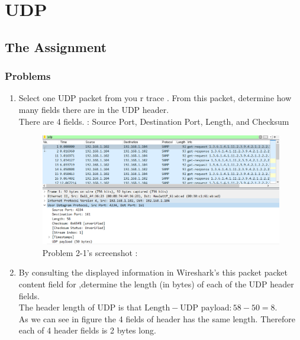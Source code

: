 \section{UDP}
\subsection{The Assignment}
    \subsubsection*{Problems}
    \begin{enumerate}[label=\bfseries Problem \arabic*:,leftmargin=*,labelindent=1em]
        \item Select one UDP packet from you r trace . From this packet, determine how many fields there are in the UDP header.\\[0.2mm]
        \soln There are 4 fields. : Source Port, Destination Port, Length, and Checksum
        \begin{figure}[!h]\centering
        \hspace{15mm}  
    		\includegraphics[width=.85\textwidth]{image/week02/2-1-1.png}
    		\caption{\footnotesize Problem 2-1's screenshot : }
    		\vspace{-10pt}
        \end{figure}
        \item By consulting the displayed information in Wireshark’s this packet packet content field for ,determine the length (in bytes) of each of the UDP header fields.\\[0.2mm]
        \soln The header length of UDP is that $\text{Length} - \text{UDP payload} : 58 - 50 = 8$.\\
        As we can see in figure the 4 fields of header has the same length. Therefore each of 4 header fields is 2 bytes long.

\end{enumerate}
